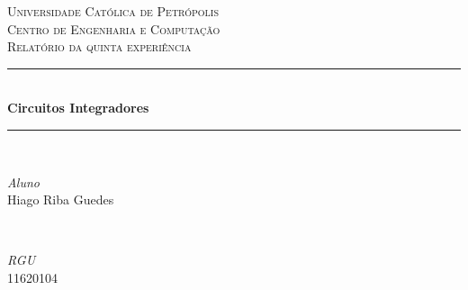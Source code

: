 \documentclass[11pt]{article}
\begin{document}

\begin{titlepage} %
	\newcommand{\HRule}{\rule{\linewidth}{0.5mm}} %
	
	\center %
	
	
	\textsc{\LARGE Universidade Católica de Petrópolis}\\[1.5cm] %
	
	\textsc{\Large Centro de Engenharia e Computação}\\[0.5cm] %
	
	\textsc{\large Relatório da quinta experiência}\\[0.5cm] %
	
	
	\HRule\\[0.4cm]
	
	{\huge\bfseries  Circuitos Integradores}\\[0.4cm] %
	
	\HRule\\[1.5cm]
	
	
	\begin{minipage}{0.4\textwidth}
		\begin{flushleft}
			\large
			\textit{Aluno}\\
			Hiago Riba Guedes %
		\end{flushleft}
	\end{minipage}
	~
	\begin{minipage}{0.4\textwidth}
		\begin{flushright}
			\large
			\textit{RGU}\\
			11620104 %
		\end{flushright}
	\end{minipage}
	

\end{titlepage}
\end{document}
